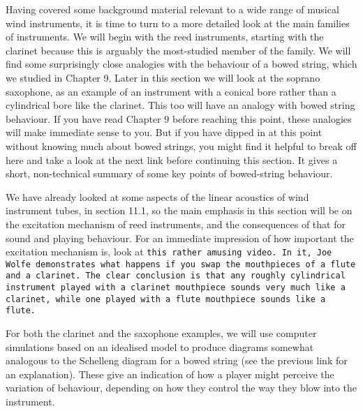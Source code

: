 

  Having covered some background material relevant to a wide range of musical 
  wind instruments, it is time to turn to a more detailed look at the main 
  families of instruments. We will begin with the reed instruments, starting 
  with the clarinet because this is arguably the most-studied member of the 
  family. We will find some surprisingly close analogies with the behaviour of 
  a bowed string, which we studied in Chapter 9. Later in this section we will 
  look at the soprano saxophone, as an example of an instrument with a conical 
  bore rather than a cylindrical bore like the clarinet. This too will have an 
  analogy with bowed string behaviour. If you have read Chapter 9 before 
  reaching this point, these analogies will make immediate sense to you. But if 
  you have dipped in at this point without knowing much about bowed strings, 
  you might find it helpful to break off here and take a look at the next link 
  before continuing this section. It gives a short, non-technical summary of 
  some key points of bowed-string behaviour. 

  We have already looked at some aspects of the linear acoustics of wind 
  instrument tubes, in section 11.1, so the main emphasis in this section will 
  be on the excitation mechanism of reed instruments, and the consequences of 
  that for sound and playing behaviour. For an immediate impression of how 
  important the excitation mechanism is, look at \tt{}this rather amusing 
  video\rm{}. In it, Joe Wolfe demonstrates what happens if you swap the 
  mouthpieces of a flute and a clarinet. The clear conclusion is that any 
  roughly cylindrical instrument played with a clarinet mouthpiece sounds very 
  much like a clarinet, while one played with a flute mouthpiece sounds like a 
  flute. 

  For both the clarinet and the saxophone examples, we will use computer 
  simulations based on an idealised model to produce diagrams somewhat 
  analogous to the Schelleng diagram for a bowed string (see the previous link 
  for an explanation). These give an indication of how a player might perceive 
  the variation of behaviour, depending on how they control the way they blow 
  into the instrument. 


